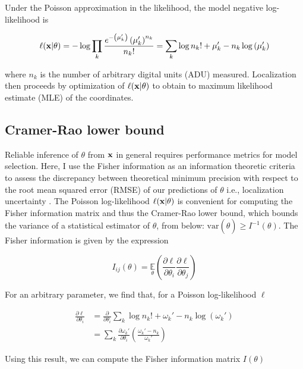 Under the Poisson approximation in the likelihood, the model negative log-likelihood is

\begin{equation}
\ell(\bold{x}\lvert\theta) = -\log \prod_{k} \frac{e^{-\left(\mu_{k}'\right)}\left(\mu_{k}'\right)^{n_{k}}}{n_{k}!} = \sum_{k}  \log n_{k}! + \mu_{k}' - n_{k}\log\left(\mu_{k}'\right)
\end{equation}

where $n_{k}$ is the number of arbitrary digital units (ADU) measured. Localization then proceeds by optimization of $\ell(\bold{x}\lvert\theta)$ to obtain to maximum likelihood estimate (MLE) of the coordinates. 

\subsection{Cramer-Rao lower bound}

Reliable inference of $\theta$ from $\bold{x}$ in general requires performance metrics for model selection. Here, I use the Fisher information as an information theoretic criteria to assess the discrepancy between theoretical minimum precision with respect to the root mean squared error (RMSE) of our predictions of $\theta$ i.e., localization uncertainty \parencite{Chao2016}. The Poisson log-likelihood $\ell(\bold{x}\lvert\theta)$ is convenient for computing the Fisher information matrix \parencite{Smith2010} and thus the Cramer-Rao lower bound, which bounds the variance of a statistical estimator of $\theta$, from below: $\mathrm{var}(\hat{\theta}) \geq I^{-1}(\theta)$. The Fisher information is given by the expression

\begin{equation}
I_{ij}(\theta) = \underset{\theta}{\mathbb{E}}\left(\frac{\partial \ell}{\partial\theta_{i}}\frac{\partial\ell}{\partial\theta_{j}}\right) 
\end{equation}

For an arbitrary parameter, we find that, for a Poisson log-likelihood $\ell$

\begin{align*}
\frac{\partial \ell}{\partial \theta_{i}} &= \frac{\partial}{\partial \theta_{i}} \sum_{k}  \log n_{k}! + \omega_{k}' - n_{k}\log\left(\omega_{k}'\right)\\
&= \sum_{k} \frac{\partial \omega_{k}'}{\partial\theta_{i}} \left(\frac{\omega_{k}'-n_{k}}{\omega_{k}'}\right)
\end{align*}

Using this result, we can compute the Fisher information matrix $I(\theta)$

